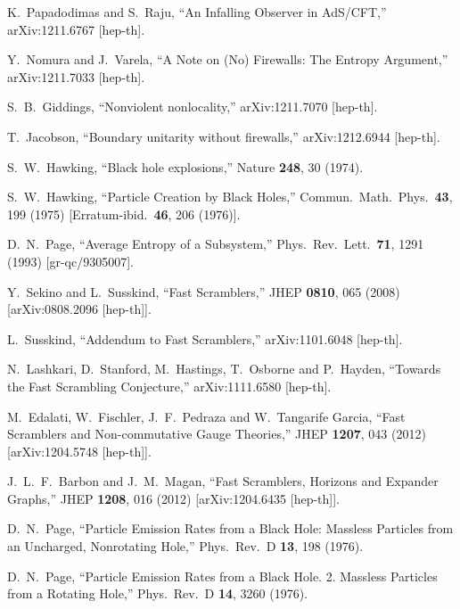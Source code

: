 \documentclass[12pt]{article}
\begin{document}
\begin{thebibliography}{99}
  K.~Papadodimas and S.~Raju,
  ``An Infalling Observer in AdS/CFT,''
  arXiv:1211.6767 [hep-th].

  Y.~Nomura and J.~Varela,
  ``A Note on (No) Firewalls: The Entropy Argument,''
  arXiv:1211.7033 [hep-th].

  S.~B.~Giddings,
  ``Nonviolent nonlocality,''
  arXiv:1211.7070 [hep-th].
  
  T.~Jacobson,
  ``Boundary unitarity without firewalls,''
  arXiv:1212.6944 [hep-th].

  S.~W.~Hawking,
  ``Black hole explosions,''
  Nature {\bf 248}, 30 (1974).
  
  S.~W.~Hawking,
  ``Particle Creation by Black Holes,''
  Commun.\ Math.\ Phys.\  {\bf 43}, 199 (1975)
  [Erratum-ibid.\  {\bf 46}, 206 (1976)].

  D.~N.~Page,
  ``Average Entropy of a Subsystem,''
  Phys.\ Rev.\ Lett.\  {\bf 71}, 1291 (1993)
  [gr-qc/9305007].
    
  Y.~Sekino and L.~Susskind,
  ``Fast Scramblers,''
  JHEP {\bf 0810}, 065 (2008)
  [arXiv:0808.2096 [hep-th]].

  L.~Susskind,
  ``Addendum to Fast Scramblers,''
  arXiv:1101.6048 [hep-th].

  N.~Lashkari, D.~Stanford, M.~Hastings, T.~Osborne and P.~Hayden,
  ``Towards the Fast Scrambling Conjecture,''
  arXiv:1111.6580 [hep-th].

  M.~Edalati, W.~Fischler, J.~F.~Pedraza and W.~Tangarife Garcia,
  ``Fast Scramblers and Non-commutative Gauge Theories,''
  JHEP {\bf 1207}, 043 (2012)
  [arXiv:1204.5748 [hep-th]].

  J.~L.~F.~Barbon and J.~M.~Magan,
  ``Fast Scramblers, Horizons and Expander Graphs,''
  JHEP {\bf 1208}, 016 (2012)
  [arXiv:1204.6435 [hep-th]].

  D.~N.~Page,
  ``Particle Emission Rates from a Black Hole: Massless Particles from an Uncharged, Nonrotating Hole,''
  Phys.\ Rev.\ D {\bf 13}, 198 (1976).
  
  D.~N.~Page,
  ``Particle Emission Rates from a Black Hole. 2. Massless Particles from a Rotating Hole,''
  Phys.\ Rev.\ D {\bf 14}, 3260 (1976).


\end{thebibliography}
\end{document}
